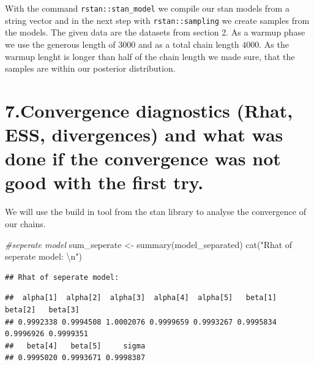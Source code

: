 \documentclass[
]{article}
\newenvironment{Shaded}{\begin{snugshade}}{\end{snugshade}}
\newcommand{\CommentTok}[1]{\textcolor[rgb]{0.56,0.35,0.01}{\textit{#1}}}
\newcommand{\DecValTok}[1]{\textcolor[rgb]{0.00,0.00,0.81}{#1}}
\newcommand{\FunctionTok}[1]{\textcolor[rgb]{0.00,0.00,0.00}{#1}}
\newcommand{\NormalTok}[1]{#1}
\newcommand{\OtherTok}[1]{\textcolor[rgb]{0.56,0.35,0.01}{#1}}
\newcommand{\SpecialCharTok}[1]{\textcolor[rgb]{0.00,0.00,0.00}{#1}}
\newcommand{\StringTok}[1]{\textcolor[rgb]{0.31,0.60,0.02}{#1}}
\begin{document}
With the command \texttt{rstan::stan\_model} we compile our stan models
from a string vector and in the next step with \texttt{rstan::sampling}
we create samples from the models. The given data are the datasets from
section 2. As a warmup phase we use the generous length of \(3000\) and
as a total chain length \(4000\). As the warmup lenght is longer than
half of the chain length we made sure, that the samples are within our
posterior distribution.

\newpage

\hypertarget{convergence-diagnostics-rhat-ess-divergences-and-what-was-done-if-the-convergence-was-not-good-with-the-first-try.}{%
\section{7.Convergence diagnostics (Rhat, ESS, divergences) and what was
done if the convergence was not good with the first
try.}\label{convergence-diagnostics-rhat-ess-divergences-and-what-was-done-if-the-convergence-was-not-good-with-the-first-try.}}

We will use the build in tool from the stan library to analyse the
convergence of our chains.

\begin{Shaded}
\begin{Highlighting}[]
\CommentTok{\#seperate model}
\NormalTok{sum\_seperate }\OtherTok{\textless{}{-}} \FunctionTok{summary}\NormalTok{(model\_separated)}
\FunctionTok{cat}\NormalTok{(}\StringTok{"Rhat of seperate model: }\SpecialCharTok{\textbackslash{}n}\StringTok{"}\NormalTok{)}
\end{Highlighting}
\end{Shaded}

\begin{verbatim}
## Rhat of seperate model:
\end{verbatim}

\begin{Shaded}
\end{Shaded}

\begin{verbatim}
##  alpha[1]  alpha[2]  alpha[3]  alpha[4]  alpha[5]   beta[1]   beta[2]   beta[3] 
## 0.9992338 0.9994508 1.0002076 0.9999659 0.9993267 0.9995834 0.9996926 0.9999351 
##   beta[4]   beta[5]     sigma 
## 0.9995020 0.9993671 0.9998387
\end{verbatim}
\end{document}
